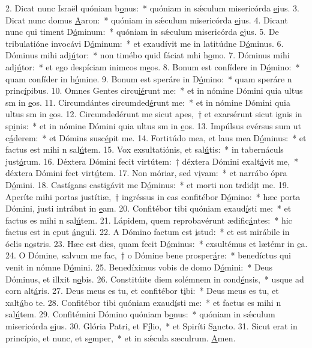 2. Dicat nunc Israël quóniam b\uline{o}nus:~* quóniam in sǽculum misericórda \uline{e}jus.
3. Dicat nunc domus \uline{A}aron:~* quóniam in sǽculum misericórda \uline{e}jus.
4. Dicant nunc qui timent D\uline{ó}minum:~* quóniam in sǽculum misericórda \uline{e}jus.
5. De tribulatióne invocávi D\uline{ó}minum:~* et exaudívit me in latitúdne D\uline{ó}minus.
6. Dóminus mihi adj\uline{ú}tor:~* non timébo quid fáciat mhi h\uline{o}mo.
7. Dóminus mihi adj\uline{ú}tor:~* et ego despíciam inimcos m\uline{e}os.
8. Bonum est confídere in D\uline{ó}mino:~* quam confíder in h\uline{ó}mine.
9. Bonum est speráre in D\uline{ó}mino:~* quam speráre n princ\uline{í}pibus.
10. Omnes Gentes circu\uline{ié}runt me:~* et in nómine Dómini quia ultus sm in \uline{e}os.
11. Circumdántes circumded\uline{é}runt me:~* et in nómine Dómini quia ultus sm in \uline{e}os.
12. Circumdedérunt me sicut apes,~† et exarsérunt sicut ignis in sp\uline{i}nis:~* et in nómine Dómini quia ultus sm in \uline{e}os.
13. Impúlsus evérsus sum ut c\uline{á}derem:~* et Dómins susc\uline{é}pit me.
14. Fortitúdo mea, et laus mea D\uline{ó}minus:~* et factus est mihi n sal\uline{ú}tem.
15. Vox exsultatiónis, et sal\uline{ú}tis:~* in tabernáculs just\uline{ó}rum.
16. Déxtera Dómini fecit virtútem:~† déxtera Dómini exalt\uline{á}vit me,~* déxtera Dómini fect virt\uline{ú}tem.
17. Non móriar, sed v\uline{i}vam:~* et narrábo ópra D\uline{ó}mini.
18. Castígans castigávit me D\uline{ó}minus:~* et morti non trdid\uline{i}t me.
19. Aperíte mihi portas justítiæ,~† ingréssus in eas confitébor D\uline{ó}mino:~* hæc porta Dómini, justi intrábnt in \uline{e}am.
20. Confitébor tibi quóniam exaud\uline{í}sti me:~* et factus es mihi n sal\uline{ú}tem.
21. Lápidem, quem reprobavérunt ædific\uline{á}ntes:~* hic factus est in cput \uline{á}nguli.
22. A Dómino factum est \uline{i}stud:~* et est mirábile in óclis n\uline{o}stris.
23. Hæc est dies, quam fecit D\uline{ó}minus:~* exsultémus et lætémr in \uline{e}a.
24. O Dómine, salvum me fac,~† o Dómine bene prosper\uline{á}re:~* benedíctus qui venit in nómne D\uline{ó}mini.
25. Benedíximus vobis de domo D\uline{ó}mini:~* Deus Dóminus, et illxit n\uline{o}bis.
26. Constitúite diem solémnem in cond\uline{é}nsis,~* usque ad corn alt\uline{á}ris.
27. Deus meus es tu, et confitébor t\uline{i}bi:~* Deus meus es tu, et xalt\uline{á}bo te.
28. Confitébor tibi quóniam exaud\uline{í}sti me:~* et factus es mihi n sal\uline{ú}tem.
29. Confitémini Dómino quóniam b\uline{o}nus:~* quóniam in sǽculum misericórda \uline{e}jus.
30. Glória Patri, et F\uline{í}lio,~* et Spiríti S\uline{a}ncto.
31. Sicut erat in princípio, et nunc, et s\uline{e}mper,~* et in sǽcula sæculrum. \uline{A}men.

